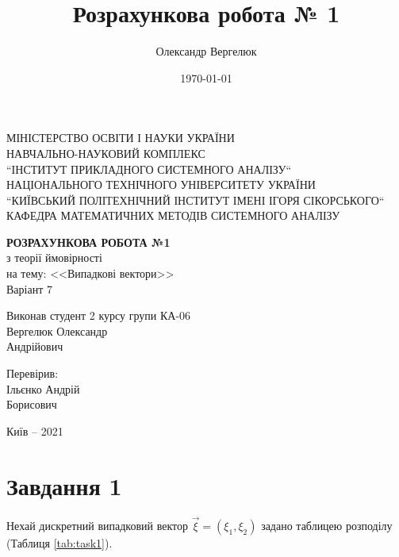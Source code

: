 \documentclass[14pt, a4paper, ukrainian]{extreport}
\title{Розрахункова робота № 1}
\author{Олександр Вергелюк}
\date{\today}
\begin{document}
	\begin{titlepage}
	\centering
	\vspace{1cm}
	{ МІНІСТЕРСТВО ОСВІТИ І НАУКИ УКРАЇНИ\\
		НАВЧАЛЬНО-НАУКОВИЙ КОМПЛЕКС\\
		``ІНСТИТУТ ПРИКЛАДНОГО СИСТЕМНОГО АНАЛІЗУ``\\
		НАЦІОНАЛЬНОГО ТЕХНІЧНОГО УНІВЕРСИТЕТУ УКРАЇНИ\\
		``КИЇВСЬКИЙ ПОЛІТЕХНІЧНИЙ ІНСТИТУТ ІМЕНІ ІГОРЯ СІКОРСЬКОГО``\\
		КАФЕДРА МАТЕМАТИЧНИХ МЕТОДІВ  СИСТЕМНОГО АНАЛІЗУ\\\par}
	\vspace{5cm}
\Large \MakeUppercase {\textsc{\textbf{{розрахункова робота №1}}}}\\
\Large {з теорії ймовірності} \\
на тему: {<<Випадкові вектори>>}\\
Варіант 7
\vfill
\newlength{\ML}
\settowidth{\ML}{\hspace{3.4cm}}
\hfill
\begin{minipage}{0.48\textwidth}
	Виконав студент 2 курсу групи КА-06\\
	Вергелюк Олександр\\ Андрійович
	
	Перевірив: \\
	Ільєнко Андрій\\ Борисович
\end{minipage}
\vfill
\begin{center}
Київ -- 2021
\end{center}
\end{titlepage}
	\chapter{Завдання 1}
	\setcounter{page}{2}
	Нехай дискретний випадковий вектор $\vec\xi = (\xi_1, \xi_2)$ задано таблицею розподілу (Таблиця {\ref {tab:task1}}).
	
	\begin{table}[H]
		\caption {\label{tab:task1} Таблиця розподілу вектора $\vec \xi$}
		
		\begin{center}
		\end{center}
	\end{table}
	
\end{document}
